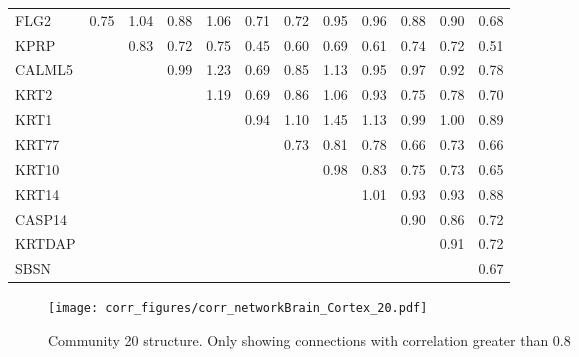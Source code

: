 \begin{longtable}{lrrrrrrrrrrr}
\bottomrule
\endlastfoot
FLG2   &       0.75 &         1.04 &       0.88 &       1.06 &        0.71 &        0.72 &        0.95 &         0.96 &         0.88 &       0.90 &          0.68 \\
KPRP   &            &         0.83 &       0.72 &       0.75 &        0.45 &        0.60 &        0.69 &         0.61 &         0.74 &       0.72 &          0.51 \\
CALML5 &            &              &       0.99 &       1.23 &        0.69 &        0.85 &        1.13 &         0.95 &         0.97 &       0.92 &          0.78 \\
KRT2   &            &              &            &       1.19 &        0.69 &        0.86 &        1.06 &         0.93 &         0.75 &       0.78 &          0.70 \\
KRT1   &            &              &            &            &        0.94 &        1.10 &        1.45 &         1.13 &         0.99 &       1.00 &          0.89 \\
KRT77  &            &              &            &            &             &        0.73 &        0.81 &         0.78 &         0.66 &       0.73 &          0.66 \\
KRT10  &            &              &            &            &             &             &        0.98 &         0.83 &         0.75 &       0.73 &          0.65 \\
KRT14  &            &              &            &            &             &             &             &         1.01 &         0.93 &       0.93 &          0.88 \\
CASP14 &            &              &            &            &             &             &             &              &         0.90 &       0.86 &          0.72 \\
KRTDAP &            &              &            &            &             &             &             &              &              &       0.91 &          0.72 \\
SBSN   &            &              &            &            &             &             &             &              &              &            &          0.67 \\
\end{longtable}


\begin{figure}[h!]
\centering
\texttt{[image: corr\_figures/corr\_networkBrain\_Cortex\_20.pdf]}
\caption{Community 20 structure. Only showing connections with correlation greater than 0.8}
\end{figure}




